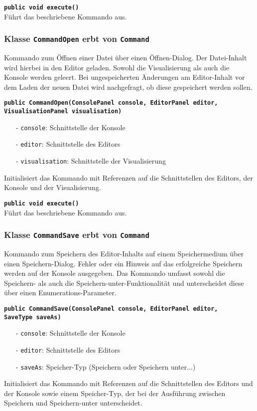 \documentclass[parskip=full,11pt,twoside]{scrartcl}
\begin{document}
\textbf{\texttt{public void execute()}}\\
Führt das beschriebene Kommando aus.

\subsubsection{Klasse \texttt{CommandOpen} erbt von \texttt{Command}}

Kommando zum Öffnen einer Datei über einen Öffnen-Dialog. Der Datei-Inhalt wird hierbei in den Editor geladen. Sowohl die Visualisierung als auch die Konsole werden geleert. Bei ungespeicherten Änderungen am Editor-Inhalt vor dem Laden der neuen Datei wird nachgefragt, ob diese gespeichert werden sollen.

\textbf{\texttt{public CommandOpen(ConsolePanel console, EditorPanel editor,\\VisualisationPanel visualisation)}}
\begin{itemize}[noitemsep]
	\item[-] \texttt{console}: Schnittstelle der Konsole
	\item[-] \texttt{editor}: Schnittstelle des Editors
	\item[-] \texttt{visualisation}: Schnittstelle der Visualisierung
\end{itemize}
Initialisiert das Kommando mit Referenzen auf die Schnittstellen des Editors, der Konsole und der Visualisierung.

\textbf{\texttt{public void execute()}}\\
Führt das beschriebene Kommando aus.

\subsubsection{Klasse \texttt{CommandSave} erbt von \texttt{Command}}

Kommando zum Speichern des Editor-Inhalts auf einem Speichermedium über einen Speichern-Dialog. Fehler oder ein Hinweis auf das erfolgreiche Speichern werden auf der Konsole ausgegeben. Das Kommando umfasst sowohl die Speichern- als auch die Speichern-unter-Funktionalität und unterscheidet diese über einen Enumerations-Parameter.

\textbf{\texttt{public CommandSave(ConsolePanel console, EditorPanel editor,\\SaveType saveAs)}}
\begin{itemize}[noitemsep]
	\item[-] \texttt{console}: Schnittstelle der Konsole
	\item[-] \texttt{editor}: Schnittstelle des Editors
	\item[-] \texttt{saveAs}: Speicher-Typ (Speichern oder Speichern unter...)
\end{itemize}
Initialisiert das Kommando mit Referenzen auf die Schnittstellen des Editors und der Konsole sowie einem Speicher-Typ, der bei der Ausführung zwischen Speichern und Speichern-unter unterscheidet.
\end{document}
